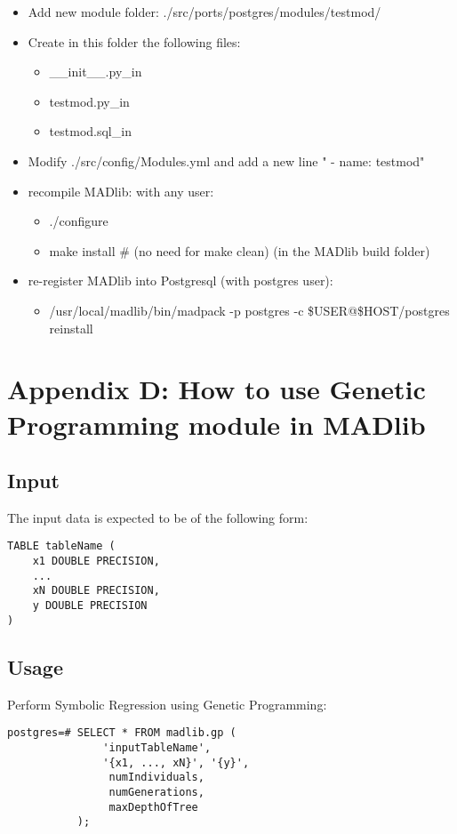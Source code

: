 \begin{itemize}
  \item Add new module folder: ./src/ports/postgres/modules/testmod/
  \item Create in this folder the following files:

\begin{itemize}
  \item \_\_init\_\_.py\_in  
  \item testmod.py\_in
  \item testmod.sql\_in
\end{itemize}

\item Modify ./src/config/Modules.yml and add a new line "	- name: testmod"
  \item recompile MADlib: with any user:

\begin{itemize}
  \item ./configure
  \item make install      \# (no need for make clean) (in the MADlib build folder)
\end{itemize}
  \item re-register MADlib into Postgresql (with postgres user):
  \begin{itemize}
  \item  /usr/local/madlib/bin/madpack -p postgres -c \$USER@\$HOST/postgres reinstall
  \end{itemize}
 \end{itemize}
 


\section*{Appendix D: How to use Genetic Programming module in MADlib}
\subsection*{Input}
The input data is expected to be of the following form:
\begin{verbatim}
TABLE tableName (
    x1 DOUBLE PRECISION,
    ...
    xN DOUBLE PRECISION,
    y DOUBLE PRECISION
)
\end{verbatim}

\subsection*{Usage}
Perform Symbolic Regression using Genetic Programming:
\begin{verbatim}
postgres=# SELECT * FROM madlib.gp (
               'inputTableName', 
               '{x1, ..., xN}', '{y}', 
                numIndividuals, 
                numGenerations, 
                maxDepthOfTree
           );
\end{verbatim}

